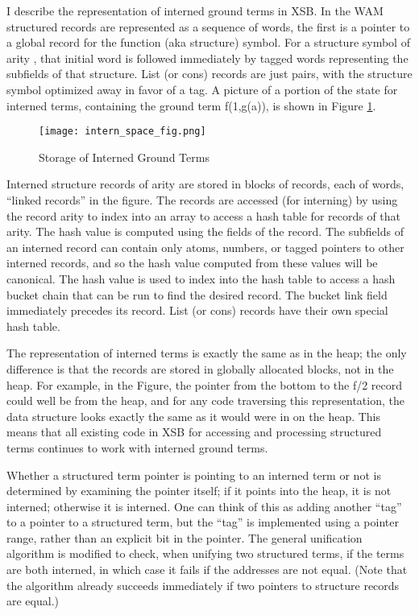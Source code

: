 \documentclass{llncs}
\begin{document}
I describe the representation of interned ground terms in XSB.  In the
WAM structured records are represented as a sequence of words, the
first is a pointer to a global record for the function (aka structure)
symbol.  For a structure symbol of arity , that initial word is
followed immediately by  tagged words representing the subfields of
that structure.  List (or cons) records are just pairs, with the
structure symbol optimized away in favor of a tag.  A picture of a
portion of the state for interned terms, containing the ground term
f(1,g(a)), is shown in Figure \ref{fig:internspace}.

\begin{figure}[ht]
\begin{center}
\texttt{[image: intern\_space\_fig.png]}
\end{center}
    \caption{Storage of Interned Ground Terms\label{fig:internspace}}
\end{figure}

Interned structure records of arity  are stored in blocks of
records, each of  words, ``linked records'' in the figure.  The
records are accessed (for interning) by using the record arity to
index into an array to access a hash table for records of that arity.
The hash value is computed using the  fields of the record.  The
subfields of an interned record can contain only atoms, numbers, or
tagged pointers to other interned records, and so the hash value
computed from these values will be canonical.  The hash value is used
to index into the hash table to access a hash bucket chain that can be
run to find the desired record.  The bucket link field immediately
precedes its record.  List (or cons) records have their own special
hash table.

The representation of interned terms is exactly the same as in the
heap; the only difference is that the records are stored in globally
allocated blocks, not in the heap.  For example, in the Figure, the
pointer from the bottom to the f/2 record could well be from the heap,
and for any code traversing this representation, the data structure
looks exactly the same as it would were in on the heap. This means
that all existing code in XSB for accessing and processing structured
terms continues to work with interned ground terms.

Whether a structured term pointer is pointing to an interned term or
not is determined by examining the pointer itself; if it points into
the heap, it is not interned; otherwise it is interned.  One can think
of this as adding another ``tag'' to a pointer to a structured term, but
the ``tag'' is implemented using a pointer range, rather than an
explicit bit in the pointer.  The general unification algorithm is
modified to check, when unifying two structured terms, if the terms
are both interned, in which case it fails if the addresses are not
equal.  (Note that the algorithm already succeeds immediately if two
pointers to structure records are equal.)
\end{document}
